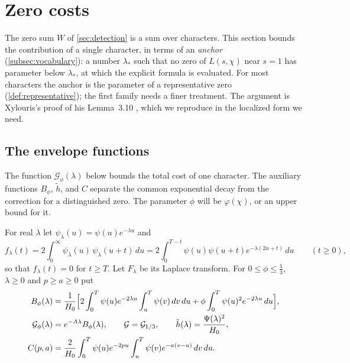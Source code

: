 \section{Zero costs}\label{sec:costs}

The zero sum $W$ of \cref{sec:detection} is a sum over characters. This section bounds the
contribution of a single character, in terms of an \emph{anchor} (\cref{subsec:vocabulary}): a
number $\lambda_*$ such that no zero of $L(s,\chi)$ near $s=1$ has parameter below $\lambda_*$, at which
the explicit formula is evaluated. For most characters the anchor is
the parameter of a representative zero (\cref{def:representative}); the first family needs a
finer treatment. The argument is Xylouris's proof of his Lemma~3.10 \cite[pp.~35--36]{Xylouris2011nullstellen},
which we reproduce in the localized form we need.

\subsection{The envelope functions}\label{subsec:envelope}
The function $\mathcal G_\phi(\lambda)$ below bounds the total cost of one character.
The auxiliary functions $B_\phi$, $\tilde h$, and $C$ separate the common exponential
decay from the correction for a distinguished zero. The parameter $\phi$ will be
$\varphi(\chi)$, or an upper bound for it.

For real $\lambda$ let $\psi_\lambda(u)=\psi(u)e^{-\lambda u}$ and
\[
  f_\lambda(t)=2\int_0^\infty\psi_\lambda(u)\,\psi_\lambda(u+t)\,du
  =2\int_0^{T-t}\psi(u)\psi(u+t)e^{-\lambda(2u+t)}\,du\qquad(t\ge0),
\]
so that $f_\lambda(t)=0$ for $t\ge T$. Let $F_\lambda$ be its Laplace transform. For
$0\le\phi\le\frac13$, $\lambda\ge0$ and $p\ge a\ge0$ put
\begin{align*}
  B_\phi(\lambda)&=\frac1{H_0}\Bigl[2\int_0^T\psi(u)e^{-2\lambda u}\int_u^T\psi(v)\,dv\,du
    +\phi\int_0^T\psi(u)^2e^{-2\lambda u}\,du\Bigr],\\
  \mathcal G_\phi(\lambda)&=e^{-A\lambda}B_\phi(\lambda),\qquad \mathcal G=\mathcal G_{1/3},\qquad
  \tilde h(\lambda)=\frac{\Psi(\lambda)^2}{H_0},\\
  C(p,a)&=\frac2{H_0}\int_0^T\psi(u)e^{-2pu}\int_u^T\psi(v)e^{-a(v-u)}\,dv\,du .
\end{align*}

